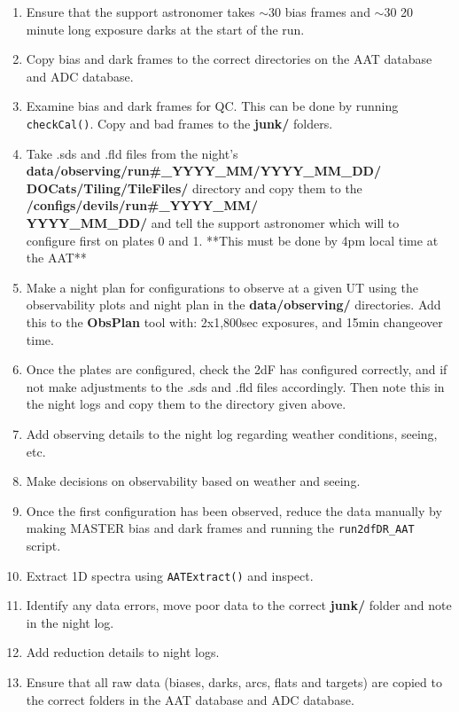 \documentclass[12pt]{article}
\begin{document}
\begin{enumerate}

\item Ensure that the support astronomer takes $\sim30$ bias frames and $\sim30$ 20 minute long exposure darks at the start of the run.

\item Copy bias and dark frames to the correct directories on the AAT database and ADC database. 

\item Examine bias and dark frames for QC. This can be done by running \texttt{checkCal()}. Copy and bad frames to the \textbf{junk/} folders.

\item Take .sds and .fld files from the night's \textbf{data/observing/run\#\_YYYY\_MM/YYYY\_MM\_DD/ \\
DOCats/Tiling/TileFiles/} directory and copy them to the \textbf{/configs/devils/run\#\_YYYY\_MM/ \\
YYYY\_MM\_DD/} and tell the support astronomer which will to configure first on plates 0 and 1.   **This must be done by 4pm local time at the AAT**

\item Make a night plan for configurations to observe at a given UT using the observability plots and night plan in the \textbf{data/observing/} directories. Add this to the \textbf{ObsPlan} tool with: 2x1,800sec exposures, and 15min changeover time. 

\item Once the plates are configured, check the 2dF has configured correctly, and if not make adjustments to the .sds and .fld files accordingly. Then note this in the night logs and copy them to the directory given above. 

\item Add observing details to the night log regarding weather conditions, seeing, etc.

\item Make decisions on observability based on weather and seeing. 

\item Once the first configuration has been observed, reduce the data manually by making MASTER bias and dark frames and running the \texttt{run2dfDR\_AAT} script.   

\item Extract 1D spectra using \texttt{AATExtract()} and inspect.

\item Identify any data errors, move poor data to the correct \textbf{junk/} folder and note in the night log.

\item Add reduction details to night logs.

\item Ensure that all raw data (biases, darks, arcs, flats and targets) are copied to the correct folders in the AAT database and ADC database.

\end{enumerate}
\end{document}
